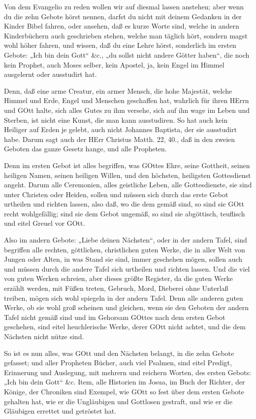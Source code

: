 Von dem Evangelio zu reden wollen wir auf diesmal lassen anstehen; aber wenn du die zehn Gebote hörst nennen, darfst du nicht mit deinem Gedanken in der Kinder Bibel fahren, oder ansehen, daß es kurze Worte sind, welche in andern Kinderbüchern auch geschrieben stehen, welche man täglich hört, sondern magst wohl höher fahren, und wissen, daß du eine Lehre hörst, sonderlich im ersten Gebote: „Ich bin dein Gott“ \&c., „du sollst nicht andere Götter haben“, die noch kein Prophet, auch Moses selber, kein Apostel, ja, kein Engel im Himmel ausgelernt oder ausstudirt hat.

Denn, daß eine arme Creatur, ein armer Mensch, die hohe Majestät, welche Himmel und Erde, Engel und Menschen geschaffen hat, wahrlich für ihren HErrn und GOtt halte, sich alles Gutes zu ihm versehe, sich auf ihn wage im Leben und Sterben, ist nicht eine Kunst, die man kann ausstudiren. So hat auch kein Heiliger auf Erden je gelebt, auch nicht Johannes Baptista, der sie ausstudirt habe. Darum sagt auch der HErr Christus Matth. 22, 40., daß in den zweien Geboten das ganze Gesetz hange, und alle Propheten.

Denn im ersten Gebot ist alles begriffen, was GOttes Ehre, seine Gottheit, seinen heiligen Namen, seinen heiligen Willen, und den höchsten, heiligsten Gottesdienst angeht. Darum alle Ceremonien, alles geistliche Leben, alle Gottesdienste, sie sind unter Christen oder Heiden, sollen und müssen sich durch das erste Gebot urtheilen und richten lassen, also daß, wo die dem gemäß sind, so sind sie GOtt recht wohlgefällig; sind sie dem Gebot ungemäß, so sind sie abgöttisch, teuflisch und eitel Greuel vor GOtt.

Also im andern Gebote: „Liebe deinen Nächsten“, oder in der andern Tafel, sind begriffen alle rechten, göttlichen, christlichen guten Werke, die in aller Welt von Jungen oder Alten, in was Stand sie sind, immer geschehen mögen, sollen auch und müssen durch die andere Tafel sich urtheilen und richten lassen. Und die viel von guten Werken schreien, aber dieses größte Register, da die guten Werke erzählt werden, mit Füßen treten, Gebruch, Mord, Dieberei ohne Unterlaß treiben, mögen sich wohl spiegeln in der andern Tafel. Denn alle anderen guten Werke, ob sie wohl groß scheinen und gleichen, wenn sie den Geboten der andern Tafel nicht gemäß sind und im Gehorsam GOttes nach dem ersten Gebot geschehen, sind eitel heuchlerische Werke, derer GOtt nicht achtet, und die dem Nächsten nicht nütze sind.

So ist es nun alles, was GOtt und den Nächsten belangt, in die zehn Gebote gefasset; und aller Propheten Bücher, auch viel Psalmen, sind eitel Predigt, Erinnerung und Auslegung, mit mehrern und reichern Worten, des ersten Gebots: „Ich bin dein Gott“ \&c. Item, alle Historien im Josua, im Buch der Richter, der Könige, der Chroniken sind Exempel, wie GOtt so fest über dem ersten Gebote gehalten hat, wie er die Ungläubigen und Gottlosen gestraft, und wie er die Gläubigen errettet und getröstet hat.

